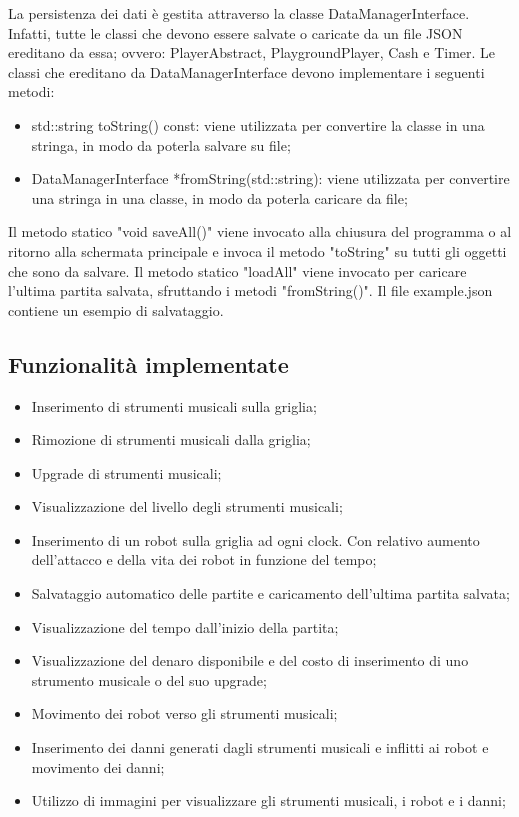 \documentclass[11pt]{article}
\begin{document}
La persistenza dei dati è gestita attraverso la classe DataManagerInterface.
Infatti, tutte le classi che devono essere salvate o caricate da un file JSON
ereditano da essa; ovvero: PlayerAbstract, PlaygroundPlayer, Cash e Timer.
Le classi che ereditano da DataManagerInterface devono implementare i seguenti
metodi:
\begin{itemize}
	\item std::string toString() const: viene utilizzata per convertire
		la classe in una stringa, in modo da poterla salvare su file;

	\item DataManagerInterface *fromString(std::string): viene utilizzata per
		convertire una stringa in una classe, in modo da poterla caricare da
		file;
\end{itemize}

Il metodo statico "void saveAll()" viene invocato alla chiusura del programma o
al ritorno alla schermata principale e invoca il metodo "toString" su tutti
gli oggetti che sono da salvare. Il metodo statico "loadAll" viene
invocato per caricare l'ultima partita salvata, sfruttando i metodi 
"fromString()". Il file example.json contiene un esempio di salvataggio.

\subsection{Funzionalità implementate}

\begin{itemize}
	\item Inserimento di strumenti musicali sulla griglia;

	\item Rimozione di strumenti musicali dalla griglia;

	\item Upgrade di strumenti musicali;

	\item Visualizzazione del livello degli strumenti musicali;

	\item Inserimento di un robot sulla griglia ad ogni clock. Con relativo
		aumento dell'attacco e della vita dei robot in funzione del tempo;

	\item Salvataggio automatico delle partite e caricamento dell'ultima
		partita salvata;

	\item Visualizzazione del tempo dall'inizio della partita;

	\item Visualizzazione del denaro disponibile e del costo di inserimento di
		uno strumento musicale o del suo upgrade;

	\item Movimento dei robot verso gli strumenti musicali;

	\item Inserimento dei danni generati dagli strumenti musicali e inflitti ai
		robot e movimento dei danni;

	\item Utilizzo di immagini per visualizzare gli strumenti musicali, i robot
		e i danni;
\end{itemize}
\end{document}
